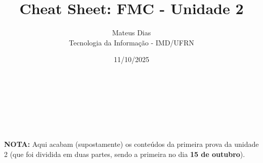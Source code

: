 \documentclass[a4paper,12pt]{article}
\title{\textbf{Cheat Sheet: FMC - Unidade 2}}
\author{Mateus Dias \\ Tecnologia da Informação - IMD/UFRN}
\date{11/10/2025}
\begin{document}
\maketitle
\vspace{12pt}


\vspace{6pt}\\


\vspace{-5pt}\\


\vspace{6pt}\\








\vspace{6pt}\\











\vspace{14pt}
\hrulefill
\vspace{20pt}

\noindent
\colorbox{yellow!30}{
    \begin{minipage}{\linewidth-2\fboxsep-2\fboxrule}
        \textbf{NOTA:}
        Aqui acabam (supostamente) os conteúdos da primeira prova da unidade 2 (que foi dividida em duas partes, sendo a primeira no dia \textbf{15 de outubro}).
    \end{minipage}
}
\end{document}
